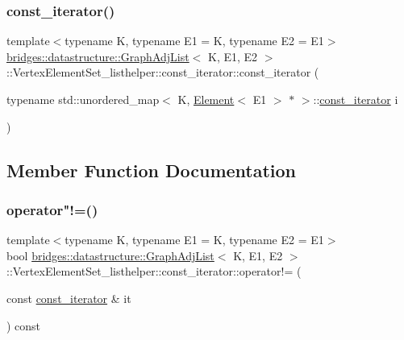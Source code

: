 \subsubsection{\texorpdfstring{const\+\_\+iterator()}{const\_iterator()}}
{\footnotesize\ttfamily template$<$typename K, typename E1 = K, typename E2 = E1$>$ \\
\hyperlink{classbridges_1_1datastructure_1_1_graph_adj_list}{bridges\+::datastructure\+::\+Graph\+Adj\+List}$<$ K, E1, E2 $>$\+::Vertex\+Element\+Set\+\_\+listhelper\+::const\+\_\+iterator\+::const\+\_\+iterator (\begin{DoxyParamCaption}\item[{typename std\+::unordered\+\_\+map$<$ K, \hyperlink{classbridges_1_1datastructure_1_1_element}{Element}$<$ E1 $>$ $\ast$ $>$\+::\hyperlink{classbridges_1_1datastructure_1_1_graph_adj_list_1_1_vertex_element_set__listhelper_1_1const__iterator}{const\+\_\+iterator}}]{i }\end{DoxyParamCaption})\hspace{0.3cm}{\ttfamily [inline]}}



\subsection{Member Function Documentation}
\mbox{\label{classbridges_1_1datastructure_1_1_graph_adj_list_1_1_vertex_element_set__listhelper_1_1const__iterator_ac7ce05d2bf7491005acf6e4a668cea1b}} 
\subsubsection{\texorpdfstring{operator"!=()}{operator!=()}}
{\footnotesize\ttfamily template$<$typename K, typename E1 = K, typename E2 = E1$>$ \\
bool \hyperlink{classbridges_1_1datastructure_1_1_graph_adj_list}{bridges\+::datastructure\+::\+Graph\+Adj\+List}$<$ K, E1, E2 $>$\+::Vertex\+Element\+Set\+\_\+listhelper\+::const\+\_\+iterator\+::operator!= (\begin{DoxyParamCaption}\item[{const \hyperlink{classbridges_1_1datastructure_1_1_graph_adj_list_1_1_vertex_element_set__listhelper_1_1const__iterator}{const\+\_\+iterator} \&}]{it }\end{DoxyParamCaption}) const\hspace{0.3cm}{\ttfamily [inline]}}

